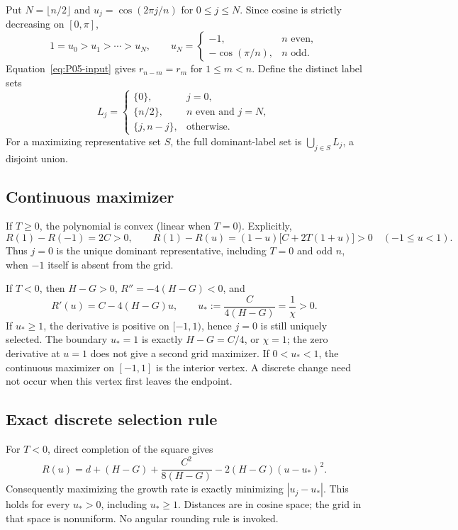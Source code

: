 Put $N=\lfloor n/2\rfloor$ and $u_j=\cos(2\pi j/n)$ for $0\le j\le N$.
Since cosine is strictly decreasing on $[0,\pi]$,
\begin{equation}
 1=u_0>u_1>\cdots>u_N,\qquad
 u_N=\begin{cases}-1,&n\text{ even},\\-\cos(\pi/n),&n\text{ odd}.
 \end{cases}
 \label{eq:P05-grid}
\end{equation}
Equation~\eqref{eq:P05-input} gives $r_{n-m}=r_m$ for $1\le m<n$.
Define the distinct label sets
\begin{equation}
 L_j=\begin{cases}
 \{0\},&j=0,\\
 \{n/2\},&n\text{ even and }j=N,\\
 \{j,n-j\},&\text{otherwise}.
 \end{cases}
 \label{eq:P05-labels}
\end{equation}
For a maximizing representative set $S$, the full dominant-label set is
$\bigcup_{j\in S}L_j$, a disjoint union.

\subsection{Continuous maximizer}

If $T\ge0$, the polynomial is convex (linear when $T=0$). Explicitly,
\[
 R(1)-R(-1)=2C>0,
 \qquad R(1)-R(u)=(1-u)\bigl[C+2T(1+u)\bigr]>0
 \quad(-1\le u<1).
\]
Thus $j=0$ is the unique dominant representative, including $T=0$ and
odd $n$, when $-1$ itself is absent from the grid.

If $T<0$, then $H-G>0$, $R''=-4(H-G)<0$, and
\begin{equation}
 R'(u)=C-4(H-G)u,\qquad
 u_*:=\frac{C}{4(H-G)}=\frac1\chi>0.
 \label{eq:P05-vertex}
\end{equation}
If $u_*\ge1$, the derivative is positive on $[-1,1)$, hence $j=0$
is still uniquely selected. The boundary $u_*=1$ is exactly
$H-G=C/4$, or $\chi=1$; the zero derivative at $u=1$ does not give
a second grid maximizer. If $0<u_*<1$, the continuous maximizer on
$[-1,1]$ is the interior vertex. A discrete change need not occur
when this vertex first leaves the endpoint.

\subsection{Exact discrete selection rule}
\label{slot:P05-2}
For $T<0$, direct completion of the square gives
\begin{equation}
 R(u)=d+(H-G)+\frac{C^2}{8(H-G)}
           -2(H-G)(u-u_*)^2.
 \label{eq:P05-square}
\end{equation}
Consequently maximizing the growth rate is exactly minimizing
$|u_j-u_*|$. This holds for every $u_*>0$, including $u_*\ge1$.
Distances are in cosine space; the grid in that space is nonuniform.
No angular rounding rule is invoked.

